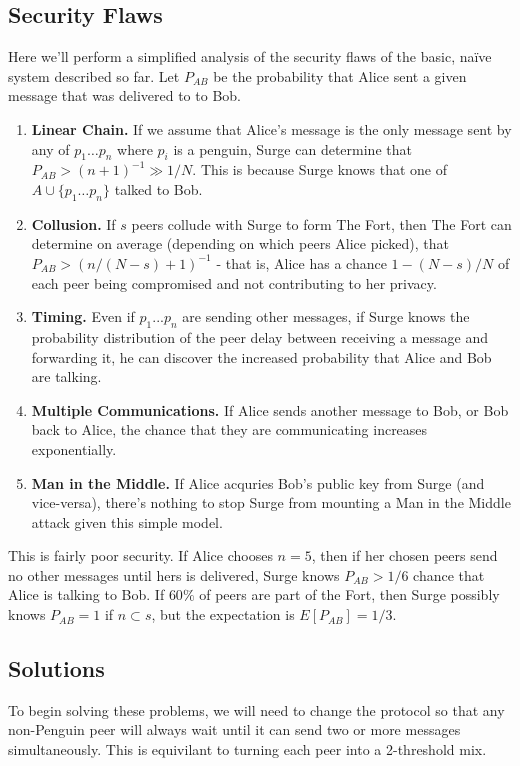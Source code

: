 \documentclass[twocolumn,11pt,english]{paper}
\begin{document}
\subsection{Security Flaws}
Here we'll perform a simplified analysis of the security flaws of the basic, na\"ive system described so far. 
Let $P_{AB}$ be the probability that Alice sent a given message that was delivered to to Bob. 
\begin{enumerate}
\item\textbf{Linear Chain.} If we assume that Alice's message is the only message sent by any of $p_1 \ldots p_n$ where $p_i$ is a penguin, Surge can determine that $P_{AB} > (n+1)^{-1} \gg 1/N$. This is because Surge knows that one of $A \cup \{p_1 \ldots p_n\}$ talked to Bob.
\item\textbf{Collusion.} If  $s$ peers collude with Surge to form The Fort, then The Fort can determine on average (depending on which peers Alice picked), that $P_{AB} > (n/(N-s)+1)^{-1}$ - that is, Alice has a chance $1 - (N-s)/N$ of each peer being compromised and not contributing to her privacy.
\item\textbf{Timing.} Even if $p_1 ... p_n$ are sending other messages, if Surge knows the probability distribution of the peer delay between receiving a message and forwarding it, he can discover the increased probability that Alice and Bob are talking. 
\item\textbf{Multiple Communications.} If Alice sends another message to Bob, or Bob back to Alice, the chance that they are communicating increases exponentially. 
\item\textbf{Man in the Middle.} If Alice acquries Bob's public key from Surge (and vice-versa), there's nothing to stop Surge from mounting a Man in the Middle attack given this simple model. 
\end{enumerate}
This is fairly poor security. If Alice chooses $n = 5$, then if her chosen peers send no other messages until hers is delivered, Surge knows $P_{AB} > 1/6$ chance that Alice is talking to Bob. If $60\%$ of peers are part of the Fort, then Surge possibly knows $P_{AB} = 1$ if $n \subset s$, but the expectation is $E[P_{AB}] = 1/3$.

\subsection{Solutions}
To begin solving these problems, we will need to change the protocol so that any non-Penguin peer will always wait until it can send two or more messages simultaneously. This is equivilant to turning each peer into a 2-threshold mix. \cite{TODO}
\end{document}
